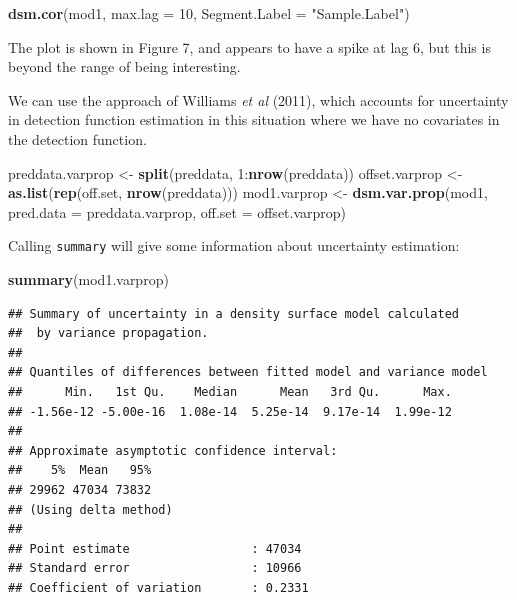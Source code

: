 \documentclass[]{article}
\newenvironment{Shaded}{}{}
\newcommand{\KeywordTok}[1]{\textcolor[rgb]{0.00,0.44,0.13}{\textbf{{#1}}}}
\newcommand{\DataTypeTok}[1]{\textcolor[rgb]{0.56,0.13,0.00}{{#1}}}
\newcommand{\DecValTok}[1]{\textcolor[rgb]{0.25,0.63,0.44}{{#1}}}
\newcommand{\StringTok}[1]{\textcolor[rgb]{0.25,0.44,0.63}{{#1}}}
\newcommand{\NormalTok}[1]{{#1}}
\begin{document}
\begin{Shaded}
\begin{Highlighting}[]
\KeywordTok{dsm.cor}\NormalTok{(mod1, }\DataTypeTok{max.lag =} \DecValTok{10}\NormalTok{, }\DataTypeTok{Segment.Label =} \StringTok{"Sample.Label"}\NormalTok{)}
\end{Highlighting}
\end{Shaded}

The plot is shown in Figure 7, and appears to have a spike at lag 6, but
this is beyond the range of being interesting.

We can use the approach of Williams \emph{et al} (2011), which accounts
for uncertainty in detection function estimation in this situation where
we have no covariates in the detection function.

\begin{Shaded}
\begin{Highlighting}[]
\NormalTok{preddata.varprop <-}\StringTok{ }\KeywordTok{split}\NormalTok{(preddata, }\DecValTok{1}\NormalTok{:}\KeywordTok{nrow}\NormalTok{(preddata))}
\NormalTok{offset.varprop <-}\StringTok{ }\KeywordTok{as.list}\NormalTok{(}\KeywordTok{rep}\NormalTok{(off.set, }\KeywordTok{nrow}\NormalTok{(preddata)))}
\NormalTok{mod1.varprop <-}\StringTok{ }\KeywordTok{dsm.var.prop}\NormalTok{(mod1, }\DataTypeTok{pred.data =} \NormalTok{preddata.varprop, }\DataTypeTok{off.set =} \NormalTok{offset.varprop)}
\end{Highlighting}
\end{Shaded}

Calling \texttt{summary} will give some information about uncertainty
estimation:

\begin{Shaded}
\begin{Highlighting}[]
\KeywordTok{summary}\NormalTok{(mod1.varprop)}
\end{Highlighting}
\end{Shaded}

\begin{verbatim}
## Summary of uncertainty in a density surface model calculated
##  by variance propagation.
## 
## Quantiles of differences between fitted model and variance model
##      Min.   1st Qu.    Median      Mean   3rd Qu.      Max. 
## -1.56e-12 -5.00e-16  1.08e-14  5.25e-14  9.17e-14  1.99e-12 
## 
## Approximate asymptotic confidence interval:
##    5%  Mean   95% 
## 29962 47034 73832 
## (Using delta method)
## 
## Point estimate                 : 47034 
## Standard error                 : 10966 
## Coefficient of variation       : 0.2331
\end{verbatim}
\end{document}
